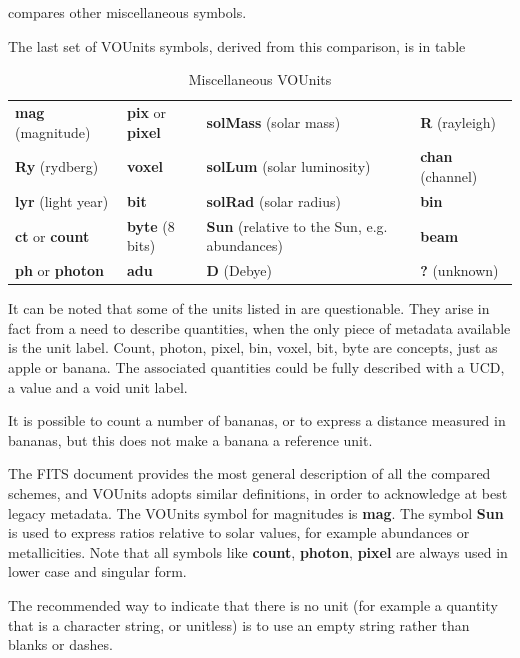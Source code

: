 \documentclass[11pt,notitlepage,onecolumn]{ivoa}
\newcommand{\unit}[1]{\textbf{\textsf{\color{orange}#1}}}
\begin{document}
\medskip

 compares other miscellaneous symbols. 

The last set of VOUnits symbols, derived from this comparison, is in
table 

\begin{table}[ht]
\begin{center}
\begin{tabular}{|l|l|p{3cm}|l|}\hline
\unit{mag} (magnitude)		&\unit{pix}  or \unit{pixel} 	&\unit{solMass} (solar mass)     &\unit{R} (rayleigh) \\
\unit{Ry} (rydberg)		&\unit{voxel}    		&\unit{solLum} (solar luminosity)&\unit{chan} (channel) 	\\
\unit{lyr} (light year)		&\unit{bit}   			&\unit{solRad} (solar radius)	&\unit{bin} \\
\unit{ct} or \unit{count}	&\unit{byte} (8 bits)   	&\unit{Sun} (relative to the Sun, e.g. abundances)&\unit{beam} 	\\
\unit{ph} or \unit{photon} 	&\unit{adu}     		&\unit{D} (Debye)	&\unit{?} (unknown)\\\hline
\end{tabular}
\end{center}
\caption{\label{tab:voumisc}Miscellaneous VOUnits}
\end{table}

It can be noted that some of the units listed in  are 
questionable. They arise in fact from a need to describe quantities, when the only
piece of metadata available is the unit label. Count, photon, pixel, bin, voxel, bit,
byte are concepts, just as apple or banana. The associated quantities could be fully
described with a UCD, a value and a void unit label.

It is possible to count a number of bananas, or to express a distance measured in
bananas, but this does not make a banana a reference unit.

The FITS document provides the most general description of all the compared schemes, 
and VOUnits adopts similar definitions, in order to acknowledge at best legacy metadata.
The VOUnits symbol for magnitudes is \unit{mag}.
The symbol \unit{Sun} is used to express ratios relative to solar values, for example
abundances or metallicities.
Note that all symbols like \unit{count}, \unit{photon}, \unit{pixel} are always used
in lower case and singular form.

The recommended way to indicate that there is no unit (for example a quantity that
is a character string, or unitless) is to use an empty string rather than blanks
or dashes.
\end{document}
